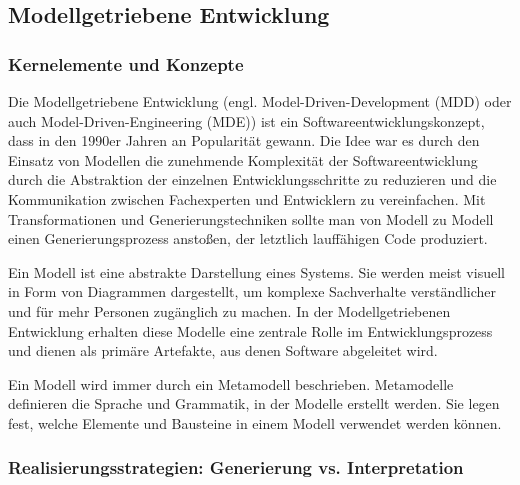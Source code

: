 \subsection{Modellgetriebene Entwicklung}\label{subsec:mdd}


\subsubsection{Kernelemente und Konzepte}\label{subsubsec:mdd-konzepte}

Die Modellgetriebene Entwicklung (engl. Model-Driven-Development (MDD) oder auch Model-Driven-Engineering (MDE)) ist ein Softwareentwicklungskonzept, dass in den 1990er Jahren an Popularität gewann. Die Idee war es durch den Einsatz von Modellen die zunehmende Komplexität der Softwareentwicklung durch die Abstraktion der einzelnen Entwicklungsschritte zu reduzieren und die Kommunikation zwischen Fachexperten und Entwicklern zu vereinfachen. Mit Transformationen und Generierungstechniken sollte man von Modell zu Modell einen Generierungsprozess anstoßen, der letztlich lauffähigen Code produziert. 

Ein Modell ist eine abstrakte Darstellung eines Systems. Sie werden meist visuell in Form von Diagrammen dargestellt, um komplexe Sachverhalte verständlicher und für mehr Personen zugänglich zu machen. In der Modellgetriebenen Entwicklung erhalten diese Modelle eine zentrale Rolle im Entwicklungsprozess und dienen als primäre Artefakte, aus denen Software abgeleitet wird. 

Ein Modell wird immer durch ein Metamodell beschrieben. Metamodelle definieren die Sprache und Grammatik, in der Modelle erstellt werden. Sie legen fest, welche Elemente und Bausteine in einem Modell verwendet werden können. 


\subsubsection{Realisierungsstrategien: Generierung vs. Interpretation}\label{subsubsec:mdd-strategien}

